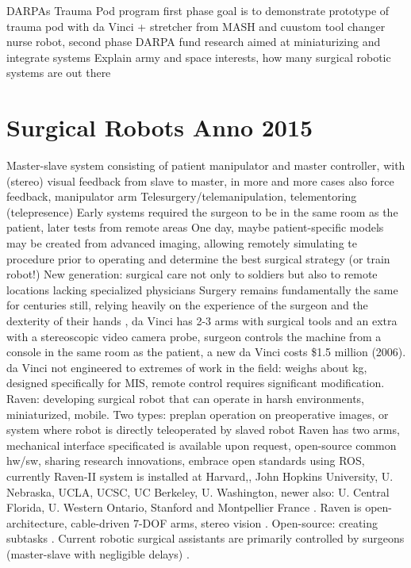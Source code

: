 DARPAs Trauma Pod program first phase goal is to demonstrate prototype of trauma pod with da Vinci + stretcher from MASH and cuustom tool changer nurse robot, second phase DARPA fund research aimed at miniaturizing and integrate systems \citep{bib:docatadist}
Explain army and space interests, how many surgical robotic systems are out there

\section{Surgical Robots Anno 2015}
Master-slave system consisting of patient manipulator and master controller, with (stereo) visual feedback from slave to master, in more and more cases also force feedback, manipulator arm
Telesurgery/telemanipulation, telementoring (telepresence)
Early systems required the surgeon to be in the same room as the patient, later tests from remote areas
One day, maybe patient-specific models may be created from advanced imaging, allowing  remotely simulating te procedure prior to operating and determine the best surgical strategy (or train robot!)
New generation: surgical care not only to soldiers but also to remote locations lacking specialized physicians
Surgery remains fundamentally the same for centuries still, relying heavily on the experience of the surgeon and the dexterity of their hands \citep{bib:docatadist},
da Vinci has 2-3 arms with surgical tools and an extra with a stereoscopic video camera probe, surgeon controls the machine from a console in the same room as the patient, a new da Vinci costs \$1.5 million (2006).
da Vinci not engineered to extremes of work in the field: weighs about  kg, designed specifically for MIS, remote control requires significant modification.
Raven: developing surgical robot that can operate in harsh environments, miniaturized, mobile.
Two types: preplan operation on preoperative images, or system where robot is directly teleoperated by slaved robot
Raven has two arms, mechanical interface specificated is available upon request, open-source common hw/sw, sharing research innovations, embrace open standards \citep{bib:raven_ii} using ROS, currently Raven-II system is installed at Harvard,, John Hopkins University, U. Nebraska, UCLA, UCSC, UC Berkeley, U. Washington, newer also: U. Central Florida, U. Western Ontario, Stanford and Montpellier France \citep{bib:raven_ii}.
Raven is open-architecture, cable-driven 7-DOF arms, stereo vision \citep{bib:raven_debride}.
Open-source: creating subtasks \citep{bib:raven_debride}.
Current robotic surgical assistants are primarily controlled by surgeons (master-slave with negligible delays) \citep{bib:raven_debride}.
